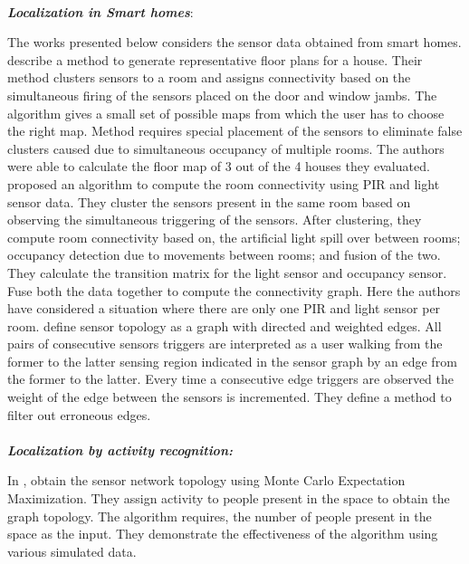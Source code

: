 \\
\textbf{\textit{Localization in Smart homes}}:\par
The works presented below considers the sensor data obtained from smart homes. 
\citeauthor{Lu:2014:SBS:2648771.2629441} \cite{Lu:2014:SBS:2648771.2629441} describe a method to generate representative floor plans for a house. Their method clusters sensors to a room and assigns connectivity based on the simultaneous firing of the sensors placed on the door and window jambs. The algorithm gives a small set of possible maps from which the user has to choose the right map. Method requires special placement of the sensors to eliminate false clusters caused due to simultaneous occupancy of multiple rooms. The authors were able to calculate the floor map of 3 out of the 4 houses they evaluated.  
 \citeauthor{ellis2012creating} \cite{ellis2012creating} proposed an algorithm to compute the room connectivity using  PIR and light sensor data. They cluster the sensors present in the same room based  on observing the simultaneous triggering of the sensors. After clustering, they compute room connectivity based on, the artificial light spill over between rooms; occupancy detection due to movements between
  rooms; and fusion of the two. They calculate the transition matrix for the light sensor and occupancy sensor. Fuse both the data together to compute the connectivity graph. Here the authors have considered a situation where there are only one PIR and light sensor per room.
\citeauthor{muller2014automated} \cite{muller2014automated} define  sensor topology as a graph with directed and weighted edges. All pairs of consecutive sensors triggers are interpreted as a user walking from the former to the latter sensing region indicated in the sensor 
graph by an edge from the former to the latter. Every time a consecutive edge triggers are observed the weight of the edge between the sensors is incremented. They define a method to filter out erroneous edges.\\ \\
\textbf{\textit{Localization by activity recognition:}}\par
In \cite{marinakis2005learning}, \citeauthor{marinakis2005learning} obtain the sensor network topology using Monte Carlo Expectation Maximization. They assign activity to people present in the space to obtain the graph topology. The algorithm requires, the number of people present in the space as the input. They demonstrate the effectiveness of the algorithm using various simulated data.\\
